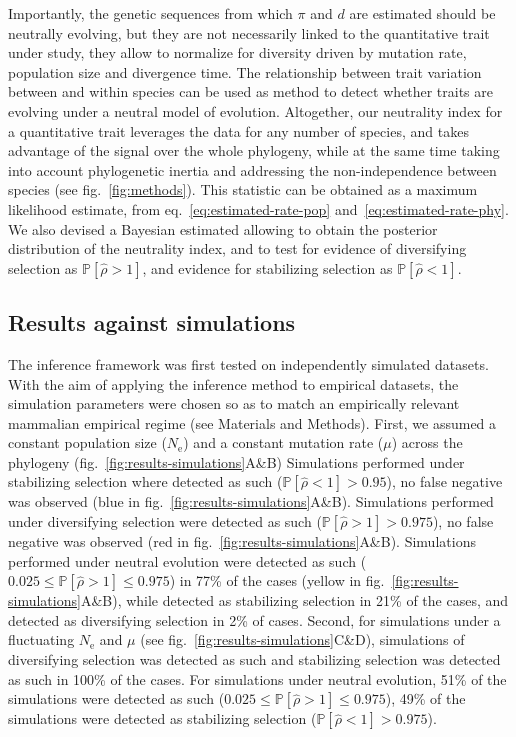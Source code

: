 \documentclass{article}
\newcommand{\Ne}{N_{\text{e}}}
\newcommand{\proba}{\mathbb{P}}
\newcommand{\MutationRate}{\mu}
\newcommand{\EstNI}{\widehat{\rho}}
\begin{document}
Importantly, the genetic sequences from which $\pi$ and $d$ are estimated should be neutrally evolving, but they are not necessarily linked to the quantitative trait under study, they allow to normalize for diversity driven by mutation rate, population size and divergence time.
The relationship between trait variation between and within species can be used as method to detect whether traits are evolving under a neutral model of evolution.
Altogether, our neutrality index for a quantitative trait leverages the data for any number of species, and takes advantage of the signal over the whole phylogeny, while at the same time taking into account phylogenetic inertia and addressing the non-independence between species (see fig.~\ref{fig:methods}).
This statistic can be obtained as a maximum likelihood estimate, from eq.~\ref{eq:estimated-rate-pop} and~\ref{eq:estimated-rate-phy}.
We also devised a Bayesian estimated allowing to obtain the posterior distribution of the neutrality index, and to test for evidence of diversifying selection as $\proba [\EstNI > 1]$, and evidence for stabilizing selection as $\proba [\EstNI < 1]$.

\subsection*{Results against simulations}\label{subsec:results-against-simulations}

The inference framework was first tested on independently simulated datasets.
With the aim of applying the inference method to empirical datasets, the simulation parameters were chosen so as to match an empirically relevant mammalian empirical regime (see Materials and Methods).
First, we assumed a constant population size ($\Ne$) and a constant mutation rate ($\MutationRate$) across the phylogeny (fig.~\ref{fig:results-simulations}A\&B)
Simulations performed under stabilizing selection where detected as such ($\proba [\EstNI < 1] > 0.95$), no false negative was observed (blue in fig.~\ref{fig:results-simulations}A\&B).
Simulations performed under diversifying selection were detected as such ($\proba [\EstNI > 1] > 0.975$), no false negative was observed (red in fig.~\ref{fig:results-simulations}A\&B).
Simulations performed under neutral evolution were detected as such ($0.025 \leq \proba [\EstNI > 1] \leq 0.975$) in 77\% of the cases (yellow in fig.~\ref{fig:results-simulations}A\&B), while detected as stabilizing selection in 21\% of the cases, and detected as diversifying selection in 2\% of cases.
Second, for simulations under a fluctuating $\Ne$ and $\MutationRate$ (see fig.~\ref{fig:results-simulations}C\&D), simulations of diversifying selection was detected as such and stabilizing selection was detected as such in 100\% of the cases.
For simulations under neutral evolution, 51\% of the simulations were detected as such ($0.025 \leq \proba [\EstNI > 1] \leq 0.975$), 49\% of the simulations were detected as stabilizing selection ($\proba [\EstNI < 1] > 0.975$).
\end{document}
